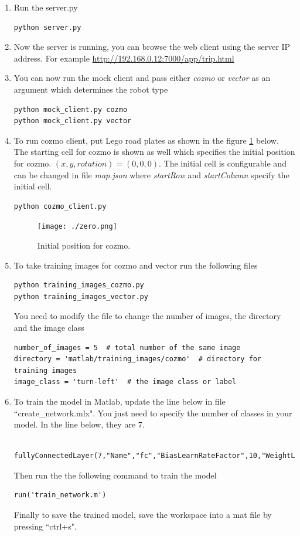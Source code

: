 \documentclass[12pt,a4paper]{article}
\begin{document}
\begin{enumerate}
\item Run the server.py 
\begin{verbatim}
python server.py
\end{verbatim}

\item Now the server is running, you can browse the web client using the server IP address. For example \url{http://192.168.0.12:7000/app/trip.html}
\item You can now run the mock client and  pass either \textit{cozmo} or \textit{vector} as an argument which determines the robot type
\begin{verbatim}
python mock_client.py cozmo
python mock_client.py vector
\end{verbatim}

\item To run cozmo client, put Lego road plates as shown in the figure \ref{fig:zero} below. The starting cell for cozmo is shown as well which specifies the initial position for cozmo. $(x, y, rotation) = (0,0, 0)$. The initial cell is configurable and can be changed in file \textit{map.json} where \textit{startRow}  and \textit{startColumn} specify the initial cell.
\begin{verbatim}
python cozmo_client.py
\end{verbatim}

\begin{figure}[H]
\center
\texttt{[image: ./zero.png]}
\caption{Initial position for cozmo. } \label{fig:zero}
\end{figure}


\item To take training images for cozmo and vector run the following files
\begin{verbatim}
python training_images_cozmo.py
python training_images_vector.py
\end{verbatim}

You need to modify the file to change the number of images, the directory and the image class

\begin{verbatim}
number_of_images = 5  # total number of the same image
directory = 'matlab/training_images/cozmo'  # directory for training images
image_class = 'turn-left'  # the image class or label
\end{verbatim}

\item To train the model in Matlab, update the line below in file ``create\_network.mlx". You just need to specify the number of classes in your model. In the line below, they are 7. 
\footnotesize
\begin{verbatim}
 fullyConnectedLayer(7,"Name","fc","BiasLearnRateFactor",10,"WeightLearnRateFactor",10)
\end{verbatim}
\normalsize
Then run the the following command to train the model 
\begin{verbatim}
run('train_network.m')
\end{verbatim}
Finally to save the trained model, save the workspace into a mat file by pressing ``ctrl+s".
\end{enumerate}
\end{document}
